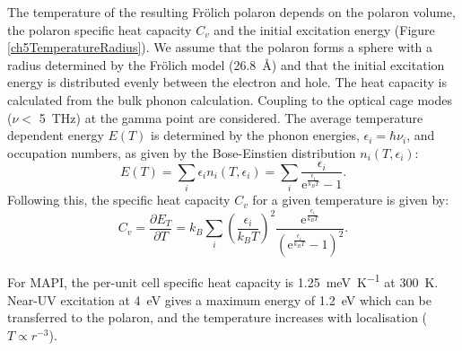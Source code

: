 \begin{table}
The temperature of the resulting Fr\"{o}lich polaron depends on the polaron volume, the polaron specific heat capacity $C_v$ and the initial excitation energy (Figure \ref{ch5TemperatureRadius}). We assume that the polaron forms a sphere with a radius determined by the Fr\"{o}lich model (\SI{26.8}{\angstrom}) and that the initial excitation energy is distributed evenly between the electron and hole. 
The heat capacity is calculated from the bulk phonon calculation. Coupling to the optical cage modes ($\nu <$ \SI{5}{\tera\hertz}\autocite{Leguy2016}) at the gamma point are considered. The average temperature dependent energy $E(T)$ is determined by the phonon energies, $\epsilon_i = \hbar\nu_i$, and occupation numbers, as given by the Bose-Einstien distribution $n_i(T,\epsilon_i)$:
\begin{equation}
    E(T) = \sum_i \epsilon_i n_i(T,\epsilon_i) = \sum_i \frac{\epsilon_i}{\textrm{e}^{\frac{\epsilon_i}{k_BT}}-1}.
\end{equation}
Following this, the specific heat capacity $C_v$ for a given temperature is given by:
\begin{equation}
    C_v = \frac{\partial E_T}{\partial T} = k_B \sum_i \left(\frac{\epsilon_i}{k_BT}\right)^2 \frac{\textrm{e}^{\frac{\epsilon_i}{k_BT}}}{\left(\textrm{e}^{\frac{\epsilon_i}{k_BT}}-1\right)^2}.
\end{equation}

For MAPI, the per-unit cell specific heat capacity is \SI{1.25}{\milli\eV\per\K} at
\SI{300}{\K}. Near-UV excitation at \SI{4}{\eV} gives a maximum energy of \SI{1.2}{\eV} which can be transferred to the polaron, and the temperature increases with localisation ($T \propto r^{-3}$).


\end{table}
